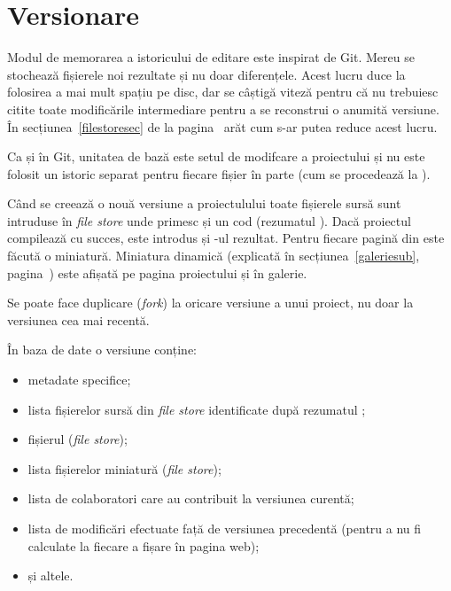 \documentclass[a4wide,12pt]{report}
\newcommand{\eng}[1]{\emph{#1}} %
\newcommand{\acr}[1]{{\textsmaller[1]{\textsc{#1}}}} %
\begin{document}
\section{Versionare}

Modul de memorarea a istoricului de editare este inspirat de Git. Mereu se
stochează fișierele noi rezultate și nu doar diferențele. Acest lucru duce la
folosirea a mai mult spațiu pe disc, dar se câștigă viteză pentru că nu
trebuiesc citite toate modificările intermediare pentru a se reconstrui o
anumită versiune. În secțiunea~\ref{filestoresec} de la
pagina~\pageref{filestoresec} arăt cum s-ar putea reduce acest lucru.

Ca și în Git, unitatea de bază este setul de modifcare a proiectului și nu este
folosit un istoric separat pentru fiecare fișier în parte (cum se procedează la
\acr{SVN}).

Când se creează o nouă versiune a proiectulului toate fișierele sursă sunt
intruduse în \eng{file store} unde primesc și un cod (rezumatul \acr{SHA1}).
Dacă proiectul compilează cu succes, este introdus și \acr{PDF}-ul rezultat.
Pentru fiecare pagină din \acr{PDF} este făcută o miniatură. Miniatura dinamică
(explicată în secțiunea~\ref{galeriesub}, pagina~\pageref{galeriesub}) este
afișată pe pagina proiectului și în galerie.

Se poate face duplicare (\eng{fork}) la oricare versiune a unui proiect, nu doar
la versiunea cea mai recentă.

În baza de date o versiune conține:

\begin{itemize}

\item metadate specifice;

\item lista fișierelor sursă din \eng{file store} identificate după rezumatul
\acr{SHA1};

\item fișierul \acr{PDF} (\eng{file store});

\item lista fișierelor miniatură (\eng{file store});

\item lista de colaboratori care au contribuit la versiunea curentă;

\item lista de modificări efectuate față de versiunea precedentă (pentru a nu fi
calculate la fiecare a fișare în pagina web);

\item și altele.

\end{itemize}
\end{document}
